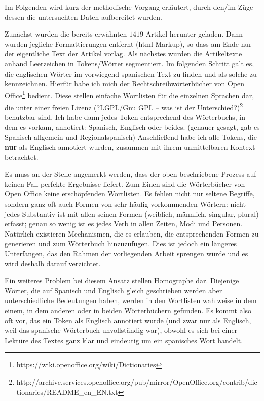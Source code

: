 Im Folgenden wird kurz der methodische Vorgang erläutert, durch den/im Züge dessen die untersuchten Daten aufbereitet wurden.

Zunächst wurden die bereits erwähnten $1419$ Artikel herunter geladen.
Dann wurden jegliche Formattierungen entfernt (html-Markup), so dass am Ende nur der eigentliche Text der Artikel vorlag.
Als nächstes wurden die Artikeltexte anhand Leerzeichen in Tokens/Wörter segmentiert.
Im folgenden Schritt galt es, die englischen Wörter im vorwiegend spanischen Text zu finden und als solche zu kennzeichnen.
Hierfür habe ich mich der Rechtschreibwörterbücher von Open Office\footnote{https://wiki.openoffice.org/wiki/Dictionaries} bedient.
Diese stellen einfache Wortlisten für die einzelnen Sprachen dar, die unter einer freien Lizenz (?LGPL/Gnu GPL -- was ist der Unterschied?)\footnote{http://archive.services.openoffice.org/pub/mirror/OpenOffice.org/contrib/dictionaries/README\_en\_EN.txt} benutzbar sind.
Ich habe dann jedes Token entsprechend des Wörterbuchs, in dem es vorkam, annotiert: Spanisch, Englisch oder beides. (genauer gesagt, gab es Spanisch allgemein und Regionalspanisch)
Anschließend habe ich alle Tokens, die \textbf{nur} als Englisch annotiert wurden, zusammen mit ihrem unmittelbaren Kontext betrachtet.

Es muss an der Stelle angemerkt werden, dass der oben beschriebene Prozess auf keinen Fall perfekte Ergebnisse liefert.
Zum Einen sind die Wörterbücher von Open Office keine erschöpfenden Wortlisten.
Es fehlen nicht nur seltene Begriffe, sondern ganz oft auch Formen von sehr häufig vorkommenden Wörtern:
nicht jedes Substantiv ist mit allen seinen Formen (weiblich, männlich, singular, plural) erfasst;
genau so wenig ist es jedes Verb in allen Zeiten, Modi und Personen.
Natürlich existieren Mechanismen, die es erlauben, die entsprechenden Formen zu generieren und zum Wörterbuch hinzuzufügen.
Dies ist jedoch ein längeres Unterfangen, das den Rahmen der vorliegenden Arbeit sprengen würde und es wird deshalb darauf verzichtet.

Ein weiteres Problem bei diesem Ansatz stellen Homographe dar.
Diejenige Wörter, die auf Spanisch und Englisch gleich geschrieben werden aber unterschiedliche Bedeutungen haben, werden in den Wortlisten wahlweise in dem einem, in dem anderen oder in beiden Wörterbüchern gefunden.
Es kommt also oft vor, das ein Token als Englisch annotiert wurde (und zwar nur als Englisch, weil das spanische Wörterbuch unvollständig war), obwohl es sich bei einer Lektüre des Textes ganz klar und eindeutig um ein spanisches Wort handelt.

